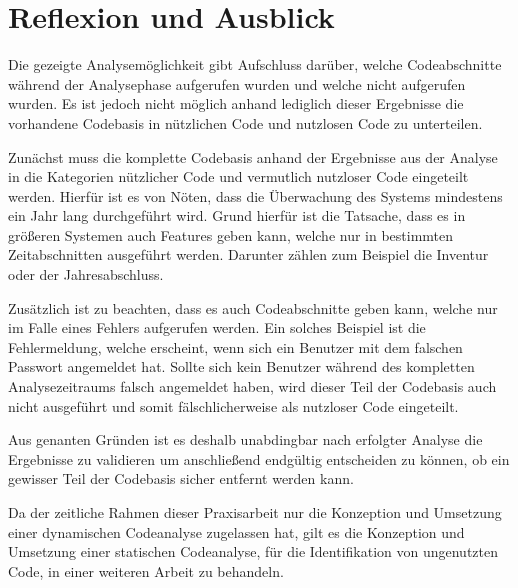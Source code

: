 \chapter{Reflexion und Ausblick\label{chap4:Viertes-Kapitel}}

Die gezeigte Analysemöglichkeit gibt Aufschluss darüber, welche Codeabschnitte während der Analysephase aufgerufen wurden und welche nicht aufgerufen wurden. Es ist jedoch nicht möglich anhand lediglich dieser Ergebnisse die vorhandene Codebasis in \glqq nützlichen Code\grqq{} und \glqq nutzlosen Code\grqq{} zu unterteilen.

Zunächst muss die komplette Codebasis anhand der Ergebnisse aus der Analyse in die Kategorien \glqq nützlicher Code\grqq{} und \glqq vermutlich nutzloser Code\grqq{} eingeteilt werden. Hierfür ist es von Nöten, dass die Überwachung des Systems mindestens ein Jahr lang durchgeführt wird. Grund hierfür ist die Tatsache, dass es in größeren Systemen auch Features geben kann, welche nur in bestimmten Zeitabschnitten ausgeführt werden. Darunter zählen zum Beispiel die Inventur oder der Jahresabschluss.

Zusätzlich ist zu beachten, dass es auch Codeabschnitte geben kann, welche nur im Falle eines Fehlers aufgerufen werden. Ein solches Beispiel ist die Fehlermeldung, welche erscheint, wenn sich ein Benutzer mit dem falschen Passwort angemeldet hat. Sollte sich kein Benutzer während des kompletten Analysezeitraums falsch angemeldet haben, wird dieser Teil der Codebasis auch nicht ausgeführt und somit fälschlicherweise als \glqq nutzloser Code\grqq{} eingeteilt.

Aus genanten Gründen ist es deshalb unabdingbar nach erfolgter Analyse die Ergebnisse zu validieren um anschließend endgültig entscheiden zu können, ob ein gewisser Teil der Codebasis sicher entfernt werden kann.

Da der zeitliche Rahmen dieser Praxisarbeit nur die Konzeption und Umsetzung einer dynamischen Codeanalyse zugelassen hat, gilt es die Konzeption und Umsetzung einer statischen Codeanalyse, für die Identifikation von ungenutzten Code, in einer weiteren Arbeit zu behandeln.